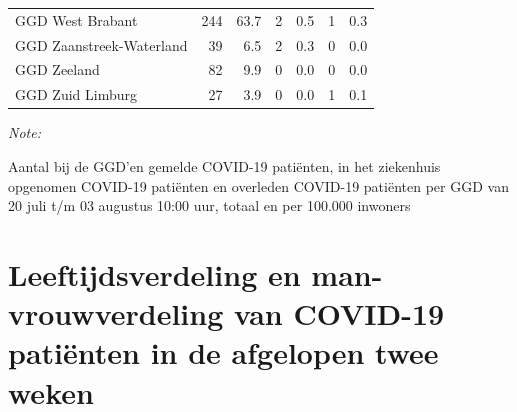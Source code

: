 \documentclass[
  english,
  man,floatsintext]{apa6}
\begin{document}
\begin{table}[H]
\begin{threeparttable}
\begin{tabular}{lrrrrrr}
GGD West Brabant & 244 & 63.7 & 2 & 0.5 & 1 & 0.3\\
GGD Zaanstreek-Waterland & 39 & 6.5 & 2 & 0.3 & 0 & 0.0\\
GGD Zeeland & 82 & 9.9 & 0 & 0.0 & 0 & 0.0\\
GGD Zuid Limburg & 27 & 3.9 & 0 & 0.0 & 1 & 0.1\\
\bottomrule
\end{tabular}
\begin{tablenotes}
\item \textit{Note: } 
\item Aantal bij de GGD’en gemelde COVID-19 patiënten, in het ziekenhuis opgenomen COVID-19 patiënten en overleden COVID-19 patiënten per GGD van 20 juli t/m 03 augustus 10:00 uur, totaal en per 100.000 inwoners
\end{tablenotes}
\end{threeparttable}
\endgroup{}
\end{table}

\newpage

\hypertarget{leeftijdsverdeling-en-man-vrouwverdeling-van-covid-19-patiuxebnten-in-de-afgelopen-twee-weken}{%
\section{Leeftijdsverdeling en man-vrouwverdeling van COVID-19 patiënten in de afgelopen twee weken}\label{leeftijdsverdeling-en-man-vrouwverdeling-van-covid-19-patiuxebnten-in-de-afgelopen-twee-weken}}
\end{document}
